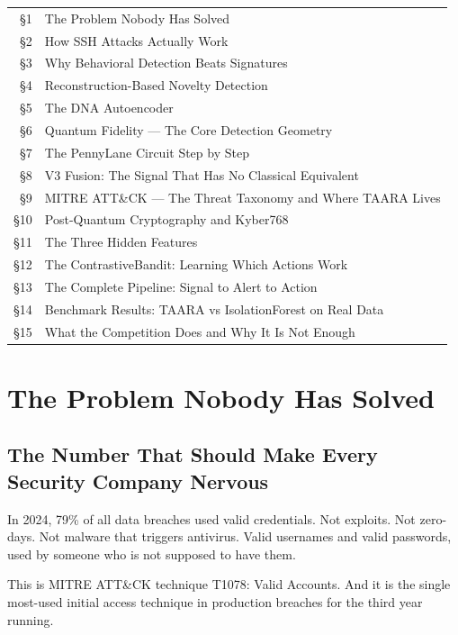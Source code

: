 \documentclass[11pt,a4paper]{article}
\begin{document}
\begin{titlepage}
{\normalsize
\begin{tabular}{@{}rl@{}}
\S1 & The Problem Nobody Has Solved \\
\S2 & How SSH Attacks Actually Work \\
\S3 & Why Behavioral Detection Beats Signatures \\
\S4 & Reconstruction-Based Novelty Detection \\
\S5 & The DNA Autoencoder \\
\S6 & Quantum Fidelity — The Core Detection Geometry \\
\S7 & The PennyLane Circuit Step by Step \\
\S8 & V3 Fusion: The Signal That Has No Classical Equivalent \\
\S9 & MITRE ATT\&CK — The Threat Taxonomy and Where TAARA Lives \\
\S10 & Post-Quantum Cryptography and Kyber768 \\
\S11 & The Three Hidden Features \\
\S12 & The ContrastiveBandit: Learning Which Actions Work \\
\S13 & The Complete Pipeline: Signal to Alert to Action \\
\S14 & Benchmark Results: TAARA vs IsolationForest on Real Data \\
\S15 & What the Competition Does and Why It Is Not Enough \\
\end{tabular}
}
\end{titlepage}

\tableofcontents\newpage

\section{The Problem Nobody Has Solved}

\subsection{The Number That Should Make Every Security Company Nervous}

In 2024, 79\% of all data breaches used valid credentials. Not exploits. Not zero-days. Not malware that triggers antivirus. Valid usernames and valid passwords, used by someone who is not supposed to have them.

This is MITRE ATT\&CK technique T1078: Valid Accounts. And it is the single most-used initial access technique in production breaches for the third year running.
\end{document}
